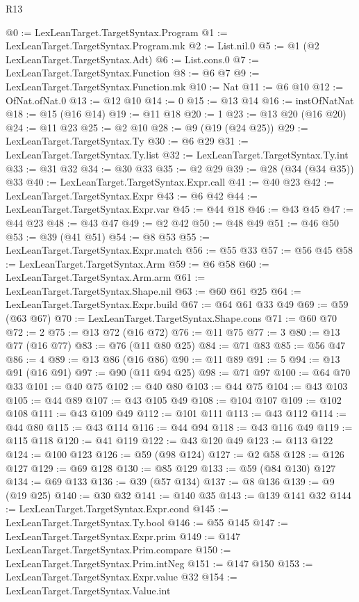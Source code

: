 \begin{lexlean}{R13}
\begin{coremodule}
@0 := LexLeanTarget.TargetSyntax.Program
@1 := LexLeanTarget.TargetSyntax.Program.mk
@2 := List.nil.{0}
@5 := @1 (@2 LexLeanTarget.TargetSyntax.Adt)
@6 := List.cons.{0}
@7 := LexLeanTarget.TargetSyntax.Function
@8 := @6 @7
@9 := LexLeanTarget.TargetSyntax.Function.mk
@10 := Nat
@11 := @6 @10
@12 := OfNat.ofNat.{0}
@13 := @12 @10
@14 := 0
@15 := @13 @14
@16 := instOfNatNat
@18 := @15 (@16 @14)
@19 := @11 @18
@20 := 1
@23 := @13 @20 (@16 @20)
@24 := @11 @23
@25 := @2 @10
@28 := @9 (@19 (@24 @25))
@29 := LexLeanTarget.TargetSyntax.Ty
@30 := @6 @29
@31 := LexLeanTarget.TargetSyntax.Ty.list
@32 := LexLeanTarget.TargetSyntax.Ty.int
@33 := @31 @32
@34 := @30 @33
@35 := @2 @29
@39 := @28 (@34 (@34 @35)) @33
@40 := LexLeanTarget.TargetSyntax.Expr.call
@41 := @40 @23
@42 := LexLeanTarget.TargetSyntax.Expr
@43 := @6 @42
@44 := LexLeanTarget.TargetSyntax.Expr.var
@45 := @44 @18
@46 := @43 @45
@47 := @44 @23
@48 := @43 @47
@49 := @2 @42
@50 := @48 @49
@51 := @46 @50
@53 := @39 (@41 @51)
@54 := @8 @53
@55 := LexLeanTarget.TargetSyntax.Expr.match
@56 := @55 @33
@57 := @56 @45
@58 := LexLeanTarget.TargetSyntax.Arm
@59 := @6 @58
@60 := LexLeanTarget.TargetSyntax.Arm.arm
@61 := LexLeanTarget.TargetSyntax.Shape.nil
@63 := @60 @61 @25
@64 := LexLeanTarget.TargetSyntax.Expr.build
@67 := @64 @61 @33 @49
@69 := @59 (@63 @67)
@70 := LexLeanTarget.TargetSyntax.Shape.cons
@71 := @60 @70
@72 := 2
@75 := @13 @72 (@16 @72)
@76 := @11 @75
@77 := 3
@80 := @13 @77 (@16 @77)
@83 := @76 (@11 @80 @25)
@84 := @71 @83
@85 := @56 @47
@86 := 4
@89 := @13 @86 (@16 @86)
@90 := @11 @89
@91 := 5
@94 := @13 @91 (@16 @91)
@97 := @90 (@11 @94 @25)
@98 := @71 @97
@100 := @64 @70 @33
@101 := @40 @75
@102 := @40 @80
@103 := @44 @75
@104 := @43 @103
@105 := @44 @89
@107 := @43 @105 @49
@108 := @104 @107
@109 := @102 @108
@111 := @43 @109 @49
@112 := @101 @111
@113 := @43 @112
@114 := @44 @80
@115 := @43 @114
@116 := @44 @94
@118 := @43 @116 @49
@119 := @115 @118
@120 := @41 @119
@122 := @43 @120 @49
@123 := @113 @122
@124 := @100 @123
@126 := @59 (@98 @124)
@127 := @2 @58
@128 := @126 @127
@129 := @69 @128
@130 := @85 @129
@133 := @59 (@84 @130) @127
@134 := @69 @133
@136 := @39 (@57 @134)
@137 := @8 @136
@139 := @9 (@19 @25)
@140 := @30 @32
@141 := @140 @35
@143 := @139 @141 @32
@144 := LexLeanTarget.TargetSyntax.Expr.cond
@145 := LexLeanTarget.TargetSyntax.Ty.bool
@146 := @55 @145
@147 := LexLeanTarget.TargetSyntax.Expr.prim
@149 := @147 LexLeanTarget.TargetSyntax.Prim.compare
@150 := LexLeanTarget.TargetSyntax.Prim.intNeg
@151 := @147 @150
@153 := LexLeanTarget.TargetSyntax.Expr.value @32
@154 := LexLeanTarget.TargetSyntax.Value.int

\end{coremodule}
\end{lexlean}
